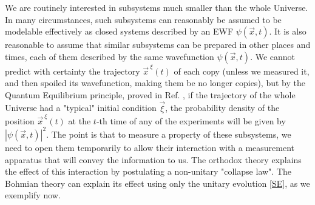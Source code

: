 \documentclass[11pt, a4paper]{article} %
\begin{document}
We are routinely interested in subsystems much smaller than the whole Universe. In many circumstances, such subsystems can reasonably be assumed to be modelable effectively as closed systems described by an EWF $\psi(\vec{x},t)$. It is also reasonable to assume that similar subsystems can be prepared in other places and times, each of them described by the same wavefunction $\psi(\vec{x},t)$. We cannot predict with certainty the trajectory $\vec{x}^{\:\xi}(t)$ of each copy (unless we measured it, and then spoiled its wavefunction, making them be no longer copies), but by the Quantum Equilibrium principle, proved in Ref. \cite{Absolute}, if the trajectory of the whole Universe had a "typical" initial condition $\vec{\xi}$, the probability density of the position $\vec{x}^{\:\xi}(t)$ at the $t$-th time of any of the experiments will be given by $|\psi(\vec{x},t)|^2$. The point is that to measure a property of these subsystems, we need to open them temporarily to allow their interaction with a measurement apparatus that will convey the information to us. The orthodox theory explains the effect of this interaction by postulating a non-unitary "collapse law". The Bohmian theory can explain its effect using only the unitary evolution \eqref{SE}, as we exemplify now.%
\end{document}

